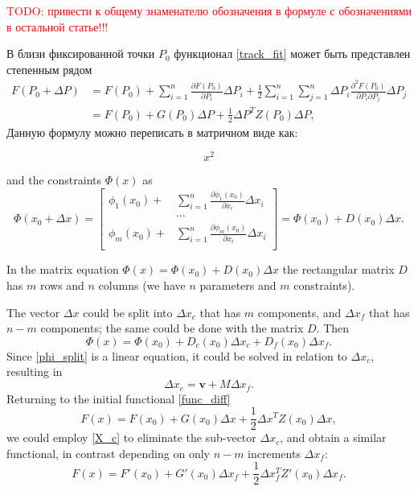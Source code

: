 \textcolor{red}{TODO: привести к общему знаменателю обозначения в формуле с обозначениями в остальной статье!!!}

В близи фиксированной точки $P_0$ функционал \eqref{track_fit} может быть представлен степенным рядом
\begin{equation}\label{func_diff}
\begin{aligned}
F(P_0+\Delta P) &= F(P_0) + \sum_{i=1}^n \frac{\partial F(P_0)}{\partial P_i} \Delta P_i + \frac{1}{2}\sum_{i=1}^n\sum_{j=1}^n \Delta P_i \frac{\partial^2 F(P_0)}{\partial P_i \partial P_j} \Delta P_j\\
&= F(P_0) + G(P_0) \Delta P + \frac{1}{2}\Delta P^T Z(P_0) \Delta P,
\end{aligned}
\end{equation}
Данную формулу можно переписать в матричном виде как:

\begin{equation}
 \label{eq_diff1}
x^2
\end{equation}


and the constraints $\Phi(x)$ as
\begin{equation}\label{constr_diff}
\Phi(x_0+\Delta x) =
\left[
\begin{aligned}
\phi_1(x_0) +& \sum_{i=1}^n \frac{\partial \phi_1(x_0)}{\partial x_i}\Delta x_i\\
&\cdots\\
\phi_m(x_0) +& \sum_{i=1}^n \frac{\partial \phi_m(x_0)}{\partial x_i}\Delta x_i\\
\end{aligned}
\right]
= \Phi(x_0) + D(x_0) \Delta x.
\end{equation}

In the matrix equation $\Phi(x) = \Phi(x_0) + D(x_0) \Delta x$ the rectangular matrix $D$ has $m$ rows and $n$ columns (we have $n$ parameters and $m$ constraints).

The vector $\Delta x$ could be split into $\Delta x_c$ that has $m$ components, and $\Delta x_f$ that has $n-m$ components; the same could be done with the matrix $D$. Then
\begin{equation}\label{phi_split}
\Phi(x) = \Phi(x_0) + D_c(x_0) \Delta x_c + D_f(x_0) \Delta x_f.
\end{equation}
Since \eqref{phi_split} is a linear equation, it could be solved in relation to $\Delta x_c$, resulting in
\begin{equation}\label{X_c}
\Delta x_c = \mathbf{v} + M \Delta x_f.
\end{equation}
Returning to the initial functional \eqref{func_diff}
\[F(x) = F(x_0) + G(x_0) \Delta x + \frac{1}{2}\Delta x^T Z(x_0) \Delta x,\]
we could employ \eqref{X_c} to eliminate the sub-vector $\Delta x_c$, and obtain a similar functional, in contrast depending on only $n-m$ increments $\Delta x_f$:
\begin{equation}\label{func_fin}
F(x) = F'(x_0) + G'(x_0) \Delta x_f + \frac{1}{2}\Delta x_f^T Z'(x_0) \Delta x_f.
\end{equation}

